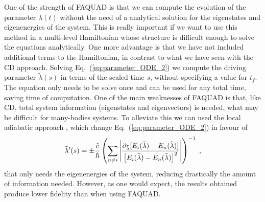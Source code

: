 One of the strength of FAQUAD is that we can compute the evolution of the parameter $\lambda(t)$ without the need of a analytical solution for the eigenstates and eigenenergies of the system. This is really important if we want to use this method in a multi-level Hamiltonian whose structure is difficult enough to solve the equations analytically. One more advantage is that we have not included additional terms to the Hamiltonian, in contrast to what we have seen with the CD approach. Solving Eq.~(\ref{eq:parameter_ODE_2}) we compute the driving parameter $\tilde{\lambda}(s)$ in terms of the scaled time $s$, without specifying a value for $t_f$. The equation only needs to be solve once and can be used for any total time, saving time of computation. One of the main weaknesses of FAQUAD is that, like CD, total system information (eigenstates and eigenvectors) is needed, what may be difficult for many-bodies systems. To alleviate this we can used the local adiabatic approach \cite{Roland2002}, which change Eq.~(\ref{eq:parameter_ODE_2}) in favour of
\begin{equation}
\tilde{\lambda}'(s)=\pm \frac{\tilde{c}}{\hbar}\left(\sum_{n\neq i}\abs{\frac{\partial_{\tilde{\lambda}}[E_i(\tilde{\lambda})-E_n(\tilde{\lambda})]} {\left[E_i(\tilde{\lambda})-E_n(\tilde{\lambda})\right]^2}}\right)^{-1}\; ,
\end{equation}
that only needs the eigenenergies of the system, reducing drastically the amount of information needed. However, as one would expect, the results obtained produce lower fidelity than when using FAQUAD.

